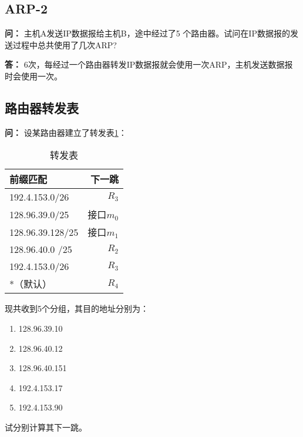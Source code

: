 \documentclass[12pt,hyperref,a4paper,UTF8]{ctexart}
\begin{document}
\subsection{ARP-2}
\textbf{问：}
主机A发送IP数据报给主机B，途中经过了5 个路由器。试问在IP数据报的发送过程中总共使用了几次ARP?

\textbf{答：}
6次，每经过一个路由器转发IP数据报就会使用一次ARP，主机发送数据报时会使用一次。


\newpage
\subsection{路由器转发表}
\textbf{问：}
设某路由器建立了转发表\ref{tab:转发表}：
\begin{table}[!ht]
    \centering
    \renewcommand{\arraystretch}{1}
    \setlength{\tabcolsep}{30pt}
    \begin{tabular}{l|r}
    \toprule
    前缀匹配    &   下一跳\\
    \midrule
    192.4.153.0/26  &   $R_3$\\
    128.96.39.0/25  &   接口$m_0$\\
    128.96.39.128/25    &   接口$m_1$\\
    128.96.40.0 /25 &   $R_2$\\
    192.4.153.0/26  &   $R_3$\\
    *（默认）   &   $R_4$\\
    \bottomrule
    \end{tabular}
    \caption{转发表}
    \label{tab:转发表}
\end{table}

现共收到5个分组，其目的地址分别为：
\begin{enumerate}[label=(\arabic*),leftmargin=2.2\parindent]
    \item 128.96.39.10
    \item 128.96.40.12
    \item 128.96.40.151
    \item 192.4.153.17
    \item 192.4.153.90
\end{enumerate}

试分别计算其下一跳。
\end{document}
